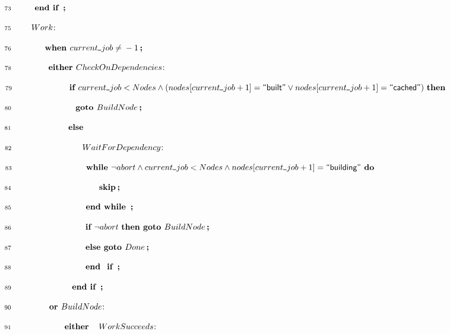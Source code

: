 \documentclass{article}
\makeatletter
\newcommand{\p@semicolon}{\textbf{\,; }}
\newcommand{\p@end}{\textbf{end }}
\newcommand{\p@do}{\textbf{ do }}
\newcommand{\p@either}{\textbf{either }}
\newcommand{\p@or}{\textbf{or }}
\newcommand{\p@goto}{\textbf{goto }}
\newcommand{\p@if}{\textbf{if }}
\newcommand{\p@then}{\,\,\textbf{then }}
\newcommand{\p@else}{\ifcsyntax \textbf{else } \else \,\,\textbf{else }\fi}
\newcommand{\p@skip}{\textbf{skip}}
\newcommand{\p@while}{\textbf{while }}
\newcommand{\p@when}{\textbf{when }}
\renewcommand{\_}{\rule{.4em}{.06em}\hspace{.05em}}
\newif\ifpcalshading \pcalshadingfalse
\newif\ifcsyntax     \csyntaxtrue
\newlength{\pcalvspace}\setlength{\pcalvspace}{0pt}%
\newcommand{\@pvspace}[1]{%
  \ifpcalshading
     \par\global\setlength{\pcalvspace}{#1}%
  \else
     \par\vspace{#1}%
  \fi
}
\renewcommand{\.}[1]{\ensuremath{\mbox{}#1\mbox{}}}
\newcommand{\@s}[1]{\hspace{#1pt}}
\newlength{\@xlen}
\newcommand\xtstrut%
  {\setlength{\@xlen}{1.05em}%
   \addtolength{\@xlen}{\pcalvspace}%
    \raisebox{\vshadelen}{\raisebox{-.25em}{\rule{0pt}{\@xlen}}}%
   \global\setlength{\vshadelen}{0pt}%
   \global\setlength{\pcalvspace}{0pt}}
\newcommand{\@x}[1]{\par
  \ifpcalshading
  \makebox[0pt][l]{\shadebox{\xtstrut\hspace*{\textwidth}}}%
  \fi
  \mbox{$\mbox{}#1\mbox{}$}}
\newcommand{\@w}[1]{\textsf{``{#1}''}}
\def\graymargin{1}
\newlength{\templena}
\newlength{\templenb}
\newcommand{\shadebox}[1]{{\setlength{\fboxsep}{\graymargin pt}%
     \savebox{\tempboxa}{#1}%
     \settoheight{\templena}{\usebox{\tempboxa}}%
     \settodepth{\templenb}{\usebox{\tempboxa}}%
     \hspace*{-\fboxsep}\raisebox{0pt}[\templena][\templenb]%
        {\colorbox{boxshade}{\usebox{\tempboxa}}}\hspace*{-\fboxsep}}}
\newlength{\vshadelen}
\makeatother
\begin{document}
 \@x{\makebox[0pt][r]{\scriptsize 73\hspace{1em}}\@s{20.5} {\p@end} {\p@if}
 {\p@semicolon}}%
\@pvspace{8.0pt}%
 \@x{\makebox[0pt][r]{\scriptsize 75\hspace{1em}}\@s{16.4}
 Work\@s{.5}\textrm{:}\@s{3}}%
 \@x{\makebox[0pt][r]{\scriptsize 76\hspace{1em}}\@s{32.8} {\p@when}
 current\_job \.{\neq} \.{-} 1 {\p@semicolon}}%
\@pvspace{8.0pt}%
 \@x{\makebox[0pt][r]{\scriptsize 78\hspace{1em}}\@s{36.89} {\p@either}
 CheckOnDependencies\@s{.5}\textrm{:}\@s{3}}%
 \@x{\makebox[0pt][r]{\scriptsize 79\hspace{1em}}\@s{61.49} {\p@if}
 current\_job \.{<} Nodes \.{\land} ( nodes [ current\_job \.{+} 1 ]
 \.{=}\@w{built} \.{\lor} nodes [ current\_job \.{+} 1 ] \.{=}\@w{cached} )
 {\p@then}}%
 \@x{\makebox[0pt][r]{\scriptsize 80\hspace{1em}}\@s{69.7} {\p@goto} BuildNode
 {\p@semicolon}}%
\@x{\makebox[0pt][r]{\scriptsize 81\hspace{1em}}\@s{61.49} {\p@else}}%
 \@x{\makebox[0pt][r]{\scriptsize 82\hspace{1em}}\@s{77.89}
 WaitForDependency\@s{.5}\textrm{:}\@s{3}}%
 \@x{\makebox[0pt][r]{\scriptsize 83\hspace{1em}}\@s{81.99} {\p@while} {\lnot}
 abort \.{\land} current\_job \.{<} Nodes \.{\land} nodes [ current\_job
 \.{+} 1 ] \.{=}\@w{building} {\p@do}}%
 \@x{\makebox[0pt][r]{\scriptsize 84\hspace{1em}}\@s{98.39} {\p@skip}
 {\p@semicolon}}%
 \@x{\makebox[0pt][r]{\scriptsize 85\hspace{1em}}\@s{81.99} {\p@end}
 {\p@while} {\p@semicolon}}%
 \@x{\makebox[0pt][r]{\scriptsize 86\hspace{1em}}\@s{81.99} {\p@if} {\lnot}
 abort {\p@then} {\p@goto} BuildNode {\p@semicolon}}%
 \@x{\makebox[0pt][r]{\scriptsize 87\hspace{1em}}\@s{81.99} {\p@else}
 {\p@goto} Done {\p@semicolon}}%
 \@x{\makebox[0pt][r]{\scriptsize 88\hspace{1em}}\@s{81.99} {\p@end}\@s{4.1}
 {\p@if} {\p@semicolon}}%
 \@x{\makebox[0pt][r]{\scriptsize 89\hspace{1em}}\@s{65.6} {\p@end} {\p@if}
 {\p@semicolon}}%
 \@x{\makebox[0pt][r]{\scriptsize 90\hspace{1em}}\@s{38.28} {\p@or}
 BuildNode\@s{.5}\textrm{:}\@s{3}}%
 \@x{\makebox[0pt][r]{\scriptsize 91\hspace{1em}}\@s{56.70}
 {\p@either}\@s{8.2} WorkSucceeds\@s{.5}\textrm{:}\@s{3}}%
\end{document}

